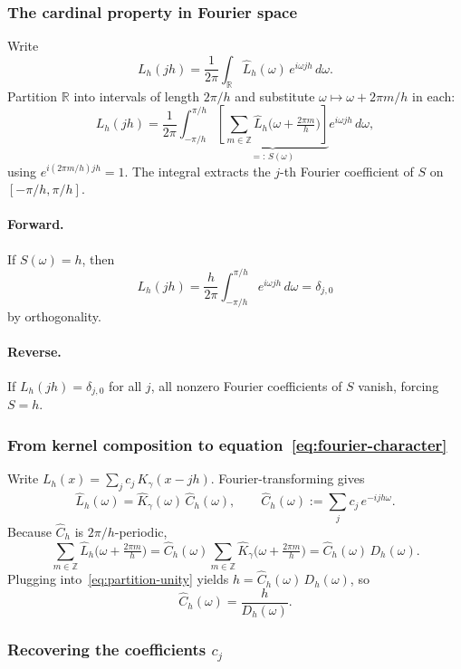 \documentclass{article}
\begin{document}
\subsubsection{The cardinal property in Fourier space}

Write
\[
  L_h(jh) = \frac{1}{2\pi}\int_{\mathbb{R}} \widehat{L}_h(\omega)\,e^{i\omega jh}\,d\omega.
\]
Partition \(\mathbb{R}\) into intervals of length \(2\pi/h\) and substitute \(\omega\mapsto \omega + 2\pi m/h\) in each:
\[
  L_h(jh)
  = \frac{1}{2\pi}\int_{-\pi/h}^{\pi/h}
    \underbrace{\left[\sum_{m\in\mathbb{Z}} \widehat{L}_h\!\Big(\omega+\tfrac{2\pi m}{h}\Big)\right]}_{=:\,S(\omega)}
    e^{i\omega jh}\,d\omega,
\]
using \(e^{i(2\pi m/h)jh}=1\).  The integral extracts the \(j\)-th Fourier coefficient of \(S\) on \([-\pi/h,\pi/h]\).

\paragraph{Forward.}
If \(S(\omega) = h\), then
\[
  L_h(jh) = \frac{h}{2\pi}\int_{-\pi/h}^{\pi/h} e^{i\omega jh}\,d\omega = \delta_{j,0}
\]
by orthogonality.

\paragraph{Reverse.}
If \(L_h(jh) = \delta_{j,0}\) for all \(j\), all nonzero Fourier coefficients of \(S\) vanish, forcing \(S=h\).

\subsubsection{From kernel composition to equation~\eqref{eq:fourier-character}}

Write \(L_h(x) = \sum_j c_j\,K_\gamma(x-jh)\).  Fourier-transforming gives
\[
  \widehat{L}_h(\omega) = \widehat{K}_\gamma(\omega)\,\widehat{C}_h(\omega),
  \qquad
  \widehat{C}_h(\omega) := \sum_j c_j\,e^{-ijh\omega}.
\]
Because \(\widehat{C}_h\) is \(2\pi/h\)-periodic,
\[
  \sum_{m\in\mathbb{Z}} \widehat{L}_h\!\Big(\omega+\tfrac{2\pi m}{h}\Big)
  = \widehat{C}_h(\omega)\sum_{m\in\mathbb{Z}} \widehat{K}_\gamma\!\Big(\omega+\tfrac{2\pi m}{h}\Big)
  = \widehat{C}_h(\omega)\,D_h(\omega).
\]
Plugging into~\eqref{eq:partition-unity} yields \(h = \widehat{C}_h(\omega)\,D_h(\omega)\), so
\[
  \widehat{C}_h(\omega) = \frac{h}{D_h(\omega)}.
\]

\subsubsection{Recovering the coefficients \(c_j\)}
\end{document}
